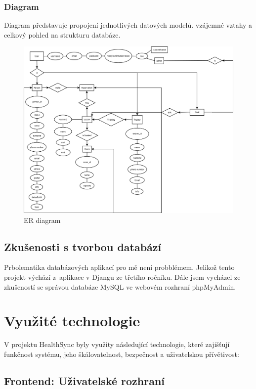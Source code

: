 \documentclass[12pt, a4paper,
openright
]{report}
\begin{document}
\subsection{Diagram}
Diagram představuje propojení jednotlivých datových modelů. vzájemné vztahy a celkový pohled na strukturu databáze.
\begin{figure}[h]
			\centering
			\includegraphics[width=1\linewidth]{image/Diagram.png} 
            \caption{ER diagram}
		\end{figure}

\section{Zkušenosti s tvorbou databází}
\label{sec:zkusenosti}

Prbolematika databázových aplikací pro mě není probblémem. Jelikož tento projekt výchází z~aplikace v Djangu ze třetího ročníku. Dále jsem vycházel ze zkušeností se správou databáze MySQL ve webovém rozhraní phpMyAdmin.

	\chapter{Využité technologie}
	V projektu HealthSync byly využity následující technologie, které zajišťují funkčnost systému, jeho škálovatelnost, bezpečnost a uživatelskou přívětivost:
	
	
	\section{Frontend: Uživatelské rozhraní} 
    
\end{document}

